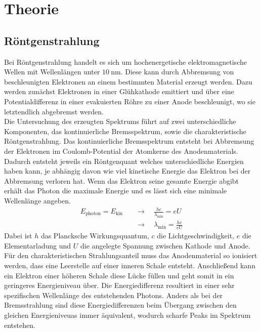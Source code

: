 \section{Theorie}

\subsection{Röntgenstrahlung}
Bei Röntgenstrahlung handelt es sich um hochenergetische elektromagnetische Wellen mit Wellenlängen unter $\SI{10}{\nano\meter}$. Diese kann
durch Abbremsung von beschleunigten Elektronen an einem bestimmten Material erzeugt werden. Dazu werden zunächst Elektronen in einer Glühkathode emittiert und über
eine Potentialdifferenz in einer evakuierten Röhre zu einer Anode beschleunigt, wo sie letztendlich abgebremst werden.
\\
Die Untersuchung des erzeugten Spektrums führt auf zwei unterschiedliche Komponenten, das kontinuierliche Bremsspektrum, sowie die charakteristische Röntgenstrahlung.
Das kontinuierliche Bremsspektrum entsteht bei Abbremsung der Elektronen im Coulomb-Potential der Atomkerne des Anodenmaterials. Dadurch entsteht jeweils ein Röntgenquant welches
 unterschiedliche Energien haben kann, je abhängig davon wie viel kinetische Energie das Elektron bei der Abbremsung verloren hat. Wenn das Elektron seine gesamte
Energie abgibt erhält das Photon die maximale Energie und es lässt sich eine minimale Wellenlänge angeben.
\\
\begin{align}
\nonumber
E_{\text{photon}} = E_{\text{kin}} \quad &\to \quad \frac{hc}{\lambda_{\text{min}}} = e U \\
&\to \quad \lambda_{\text{min}} = \frac{hc}{eU}
\end{align}
Dabei ist $h$ das Plancksche Wirkungsquantum, $c$ die Lichtgeschwindigkeit, $e$ die Elementarladung und $U$ die angelegte Spannung zwischen Kathode und Anode.
\\
Für den charakteristischen Strahlungsanteil muss das Anodenmaterial so ionisiert werden, dass eine Leerstelle auf einer inneren Schale entsteht. Anschließend kann ein Elektron einer höheren Schale diese Lücke füllen und geht
somit in ein geringeres Energieniveau über. Die Energiedifferenz resultiert in einer sehr spezifischen Wellenlänge des entstehenden Photons. Anders als bei der Bremsstrahlung sind diese Energiedifferenzen beim Übergang zwischen den
gleichen Energieniveuas immer äquivalent, wodurch scharfe Peaks im Spektrum entstehen.
\\
